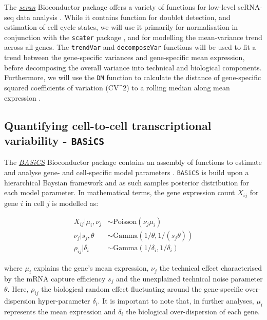 \documentclass[9pt,a4paper,]{extarticle}
\begin{document}
The \emph{\href{https://bioconductor.org/packages/3.11/scran}{scran}} Bioconductor package offers a variety of functions
for low-level scRNA-seq data analysis \citep{Lun2016}.
While it contains function for doublet detection, and estimation
of cell cycle states, we will use it primarily for normalisation in conjunction
with the \texttt{scater} package \citep{Lun2016pooling}, and for modelling the mean-variance
trend across all genes. The \texttt{trendVar} and \texttt{decomposeVar} functions will be used to fit a
trend between the gene-specific variances and gene-specific mean expression,
before decomposing the overall variance into technical and biological
components. Furthermore, we will use the \texttt{DM} function to calculate the distance
of gene-specific squared coefficients of variation (CV\^{}2) to a rolling median
along mean expression \citep{Kolodziejczyk2015cell}.

\hypertarget{quantifying-cell-to-cell-transcriptional-variability---basics}{%
\subsection{\texorpdfstring{Quantifying cell-to-cell transcriptional variability - \texttt{BASiCS}}{Quantifying cell-to-cell transcriptional variability - BASiCS}}\label{quantifying-cell-to-cell-transcriptional-variability---basics}}

The \emph{\href{https://bioconductor.org/packages/3.11/BASiCS}{BASiCS}} Bioconductor package contains an assembly of
functions to estimate and analyse gene- and cell-specific model parameters
\citep{Vallejos2015BASiCS, Vallejos2016, Eling2018}.
\texttt{BASiCS} is build upon a hierarchical Baysian framework and as such samples
posterior distribution for each model parameter.
In mathematical terms, the gene expression count \(X_{ij}\) for gene \(i\) in cell
\(j\) is modelled as:

\[
\begin{aligned}
X_{ij}|\mu_i,\nu_j&\sim{}\text{Poisson}(\nu_j\mu_i)\\
\nu_j|s_j,\theta&\sim{}\text{Gamma}(1/\theta,1/(s_j\theta))\\
\rho_{ij}|\delta_i&\sim{}\text{Gamma}(1/\delta_i,1/\delta_i)
\end{aligned}
\]

where \(\mu_i\) explains the gene's mean expression, \(\nu_j\) the technical effect
characterised by the mRNA capture efficiency \(s_j\) and the unexplained technical
noise parameter \(\theta\).
Here, \(\rho_{ij}\) the biological
random effect fluctuating around the gene-specific over-dispersion
hyper-parameter \(\delta_i\).
It is important to note that, in further analyses, \(\mu_i\) represents the
mean expression and \(\delta_i\) the biological over-dispersion of each gene.
\end{document}
